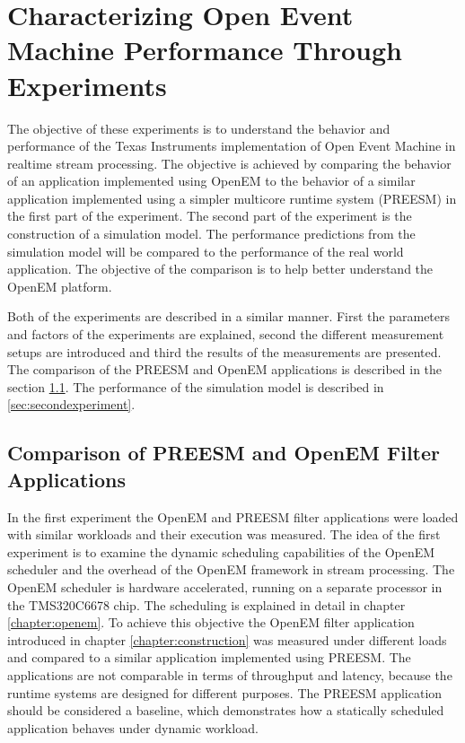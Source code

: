 \chapter [OpenEM Experiments] {Characterizing Open Event Machine Performance
Through Experiments}
\label{chapter:experiments}
The objective of these experiments is to understand the behavior and
performance of the Texas Instruments implementation of Open Event Machine in
realtime stream processing. The objective is achieved by comparing the behavior
of an application implemented using OpenEM to the behavior of a similar
application implemented using a simpler multicore runtime system (PREESM) in the
first part of the experiment. The second part of the experiment is the
construction of a simulation model. The performance predictions from the
simulation model will be compared to the performance of the real world
application. The objective of the comparison is to help better understand the
OpenEM platform.

Both of the experiments are described in a similar manner. First the parameters
and factors of the experiments are explained, second the different measurement
setups are introduced and third the results of the measurements are presented.
The comparison of the PREESM and OpenEM applications is described in the section
\ref{sec:firstexperiment}. The performance of the simulation model is described
in \ref{sec:secondexperiment}.

\section{Comparison of PREESM and OpenEM Filter Applications}
\label{sec:firstexperiment}
In the first experiment the OpenEM and PREESM filter applications were loaded
with similar workloads and their execution was measured. The idea of the first
experiment is to examine the dynamic scheduling capabilities of the OpenEM
scheduler and the overhead of the OpenEM framework in stream processing. The
OpenEM scheduler is hardware accelerated, running on a separate processor in the
TMS320C6678 chip. The scheduling is explained in detail in chapter
\ref{chapter:openem}. To achieve this objective the OpenEM filter application
introduced in chapter \ref{chapter:construction} was measured under different
loads and compared to a similar application implemented using PREESM. The
applications are not comparable in terms of throughput and latency, because the
runtime systems are designed for different purposes. The PREESM application
should be considered a baseline, which demonstrates how a statically scheduled
application behaves under dynamic workload.

